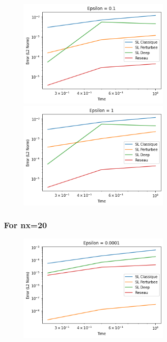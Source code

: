 \documentclass{article}
\begin{document}
\begin{figure}[!h]
    \centering
    \includegraphics[width=0.67\textwidth]{images/10ep24.png}
    \includegraphics[width=0.67\textwidth]{images/10ep25.png}
\end{figure}

\subsubsection*{For nx=20}
\begin{figure}[!h]
    \centering
    \includegraphics[width=0.67\textwidth]{images/20ep21.png}
\end{figure}
\end{document}
